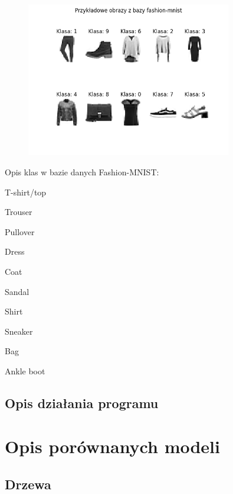 \documentclass{article}
\begin{document}
\begin{figure}[H]
    \centering
    \includegraphics[width=0.8\textwidth]{img/baza_fashion_mnist.png}
\end{figure}

Opis klas w bazie danych Fashion-MNIST:

\begin{enumerate}
    \begin{multicols}{2}
        \centering
        \setcounter{enumi}{-1}
        \item T-shirt/top
        \item Trouser
        \item Pullover
        \item Dress
        \item Coat
        \item Sandal
        \item Shirt
        \item Sneaker
        \item Bag
        \item Ankle boot
    \end{multicols}
\end{enumerate}

\subsection{Opis działania programu}


\section{Opis porównanych modeli}

\subsection{Drzewa}
\end{document}
